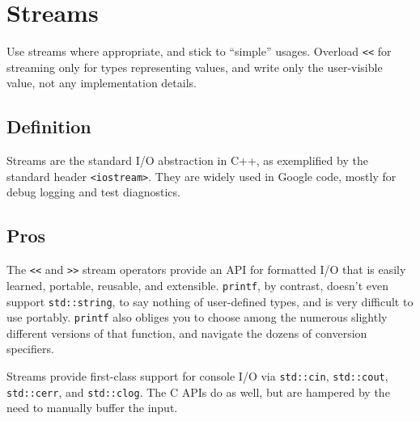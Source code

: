 
\section{Streams}\label{sec:streams}
Use streams where appropriate, and stick to \enquote{simple} usages. Overload \texttt{<<} for streaming only for types representing values, and write only the user-visible value, not any implementation details.

\subsection{Definition}
Streams are the standard I/O abstraction in C++, as exemplified by the standard header \texttt{<iostream>}. They are widely used in Google code, mostly for debug logging and test diagnostics.

\subsection{Pros}
The \texttt{<<} and \texttt{>>} stream operators provide an API for formatted I/O that is easily learned, portable, reusable, and extensible. \texttt{printf}, by contrast, doesn't even support \texttt{std::string}, to say nothing of user-defined types, and is very difficult to use portably. \texttt{printf} also obliges you to choose among the numerous slightly different versions of that function, and navigate the dozens of conversion specifiers.

Streams provide first-class support for console I/O via \texttt{std::cin}, \texttt{std::cout}, \texttt{std::cerr}, and \texttt{std::clog}. The C APIs do as well, but are hampered by the need to manually buffer the input.

